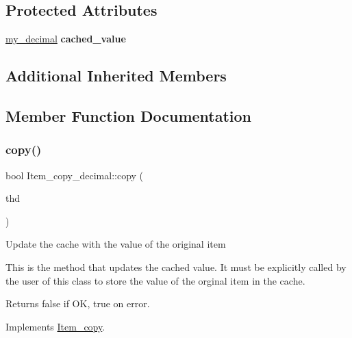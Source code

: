 \subsection*{Protected Attributes}
\begin{DoxyCompactItemize}
\item 
\mbox{\label{classItem__copy__decimal_ae0204751066b432f2bd046a6ea93fe6b}} 
\mbox{\hyperlink{classmy__decimal}{my\+\_\+decimal}} {\bfseries cached\+\_\+value}
\end{DoxyCompactItemize}
\subsection*{Additional Inherited Members}


\subsection{Member Function Documentation}
\mbox{\label{classItem__copy__decimal_a22459a6e13d4ab30f14818c9b0c65730}} 
\subsubsection{\texorpdfstring{copy()}{copy()}}
{\footnotesize\ttfamily bool Item\+\_\+copy\+\_\+decimal\+::copy (\begin{DoxyParamCaption}\item[{const T\+HD $\ast$}]{thd }\end{DoxyParamCaption})\hspace{0.3cm}{\ttfamily [virtual]}}

Update the cache with the value of the original item

This is the method that updates the cached value. It must be explicitly called by the user of this class to store the value of the orginal item in the cache. \begin{DoxyReturn}{Returns}
false if OK, true on error. 
\end{DoxyReturn}


Implements \mbox{\hyperlink{classItem__copy_a575caec22eeb27fb76d5aa74b1a8d492}{Item\+\_\+copy}}.

\mbox{\label{classItem__copy__decimal_a8e57c99667202306a06a0c46d8f4597a}} 
